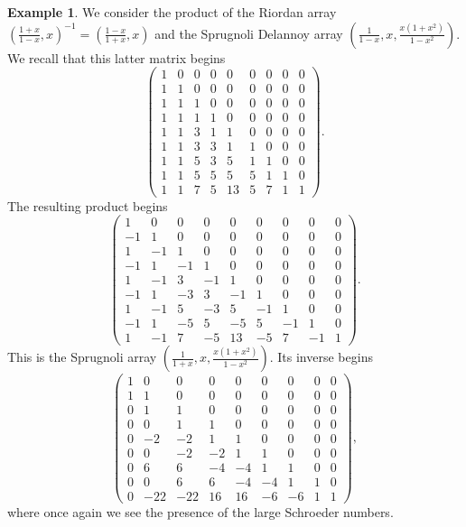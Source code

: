 \documentclass[12pt,reqno]{article}
\theoremstyle{definition}
\newtheorem{example}[theorem]{Example}
\begin{document}
\begin{example}
We consider the product of the Riordan array $\left(\frac{1+x}{1-x},x\right)^{-1}=\left(\frac{1-x}{1+x},x\right)$ and the Sprugnoli Delannoy array $\left(\frac{1}{1-x}, x, \frac{x(1+x^2)}{1-x^2}\right)$. We recall that this latter matrix begins
$$\left(\begin{array}{cccccccccc}
1 & 0 & 0 & 0 & 0 & 0 & 0 & 0 & 0 \\
1 & 1 & 0 & 0 & 0 & 0 & 0 & 0 & 0 \\
1 & 1 & 1 & 0 & 0 & 0 & 0 & 0 & 0 \\
1 & 1 & 1 & 1 & 0 & 0 & 0 & 0 & 0 \\
1 & 1 & 3 & 1 & 1 & 0 & 0 & 0 & 0 \\
1 & 1 & 3 & 3 & 1 & 1 & 0 & 0 & 0 \\
1 & 1 & 5 & 3 & 5 & 1 & 1 & 0 & 0 \\
1 & 1 & 5 & 5 & 5 & 5 & 1 & 1 & 0 \\
1 & 1 & 7 & 5 & 13 & 5 & 7 & 1 & 1
\end{array}\right).$$ The resulting product begins
$$\left(\begin{array}{cccccccccc}
1 & 0 & 0 & 0 & 0 & 0 & 0 & 0 & 0 \\
-1 & 1 & 0 & 0 & 0 & 0 & 0 & 0 & 0 \\
1 & -1 & 1 & 0 & 0 & 0 & 0 & 0 & 0 \\
-1 & 1 & -1 & 1 & 0 & 0 & 0 & 0 & 0 \\
1 & -1 & 3 & -1 & 1 & 0 & 0 & 0 & 0 \\
-1 & 1 & -3 & 3 & -1 & 1 & 0 & 0 & 0 \\
1 & -1 & 5 & -3 & 5 & -1 & 1 & 0 & 0 \\
-1 & 1 & -5 & 5 & -5 & 5 & -1 & 1 & 0 \\
1 & -1 & 7 & -5 & 13 & -5 & 7 & -1 & 1
\end{array}\right).$$
This is the Sprugnoli array $\left(\frac{1}{1+x}, x, \frac{x(1+x^2)}{1-x^2}\right)$. Its inverse begins
$$\left(\begin{array}{cccccccccc}
1 & 0 & 0 & 0 & 0 & 0 & 0 & 0 & 0 \\
1 & 1 & 0 & 0 & 0 & 0 & 0 & 0 & 0 \\
0 & 1 & 1 & 0 & 0 & 0 & 0 & 0 & 0 \\
0 & 0 & 1 & 1 & 0 & 0 & 0 & 0 & 0 \\
0 & -2 & -2 & 1 & 1 & 0 & 0 & 0 & 0 \\
0 & 0 & -2 & -2 & 1 & 1 & 0 & 0 & 0 \\
0 & 6 & 6 & -4 & -4 & 1 & 1 & 0 & 0 \\
0 & 0 & 6 & 6 & -4 & -4 & 1 & 1 & 0 \\
0 & -22 & -22 & 16 & 16 & -6 & -6 & 1 & 1
\end{array}\right),$$ where once again we see the presence of the large Schroeder numbers.
\end{example}
\end{document}

